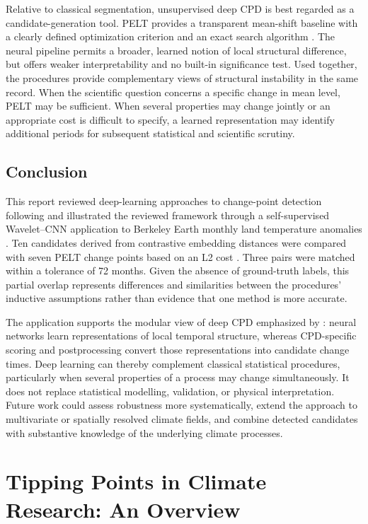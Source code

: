 \documentclass[
]{krantz}
\begin{document}
Relative to classical segmentation, unsupervised deep CPD is best regarded as a candidate-generation tool. PELT provides a transparent mean-shift baseline with a clearly defined optimization criterion and an exact search algorithm \citep{killick2012}. The neural pipeline permits a broader, learned notion of local structural difference, but offers weaker interpretability and no built-in significance test. Used together, the procedures provide complementary views of structural instability in the same record. When the scientific question concerns a specific change in mean level, PELT may be sufficient. When several properties may change jointly or an appropriate cost is difficult to specify, a learned representation may identify additional periods for subsequent statistical and scientific scrutiny.

\section{Conclusion}\label{conclusion-5}

This report reviewed deep-learning approaches to change-point detection following \citep{xu2025} and illustrated the reviewed framework through a self-supervised Wavelet--CNN application to Berkeley Earth monthly land temperature anomalies \citep{berkeleyearth2024}. Ten candidates derived from contrastive embedding distances were compared with seven PELT change points based on an L2 cost \citep{killick2012}. Three pairs were matched within a tolerance of 72 months. Given the absence of ground-truth labels, this partial overlap represents differences and similarities between the procedures' inductive assumptions rather than evidence that one method is more accurate.

The application supports the modular view of deep CPD emphasized by \citep{xu2025}: neural networks learn representations of local temporal structure, whereas CPD-specific scoring and postprocessing convert those representations into candidate change times. Deep learning can thereby complement classical statistical procedures, particularly when several properties of a process may change simultaneously. It does not replace statistical modelling, validation, or physical interpretation. Future work could assess robustness more systematically, extend the approach to multivariate or spatially resolved climate fields, and combine detected candidates with substantive knowledge of the underlying climate processes.

\chapter{Tipping Points in Climate Research: An Overview}\label{tp-overview}
\end{document}

